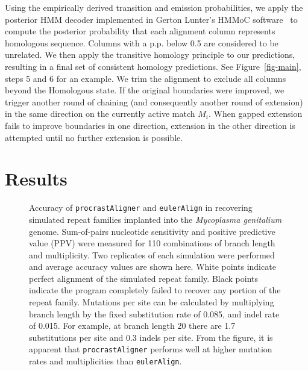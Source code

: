 \documentclass{ws-procs975x65}
\begin{document}
Using the empirically derived transition and emission probabilities, we apply the posterior HMM decoder implemented in Gerton Lunter's HMMoC software~\cite{hmmoc} to compute the posterior probability that each alignment column represents homologous sequence.  Columns with a p.p. below 0.5 are considered to be unrelated.  We then apply the transitive homology principle to our predictions, resulting in a final set of consistent homology predictions.  See Figure~\ref{fig-main}, steps 5 and 6 for an example. We trim the alignment to exclude all columns beyond the Homologous state. If the original boundaries were improved, we trigger another round of chaining (and consequently another round of extension) in the same direction on the currently active match $M_i$.  When gapped extension fails to improve boundaries in one direction, extension in the other direction is attempted until no further extension is possible.


\section{Results}
\begin{figure}[t]
\centering {}
\caption{Accuracy of \texttt{procrastAligner} and \texttt{eulerAlign} in recovering simulated repeat families implanted into the \textit{Mycoplasma genitalium} genome.  Sum-of-pairs nucleotide sensitivity and positive predictive value (PPV) were measured for 110 combinations of branch length and multiplicity.  Two replicates of each simulation were performed and
average accuracy values are shown here.  White points indicate perfect alignment of the simulated repeat family.  Black points indicate the program completely failed to recover any portion of the repeat family.  Mutations per site can be calculated by multiplying branch length by the fixed substitution rate of 0.085, and indel rate of 0.015.  
For example, at branch length 20 there are 1.7 substitutions per site and 0.3 indels per site.
From the figure, it is apparent that \texttt{procrastAligner} performs well at higher mutation rates and multiplicities than \texttt{eulerAlign}.}
\label{fig-results}\vspace{-0.2cm}
\end{figure}


%
%
\end{document}
